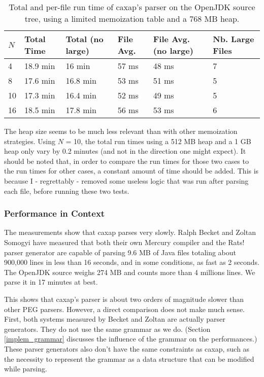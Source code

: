 \begin{table}[here]
\begin{tabular}{|l|l|l|l|l|l|}
\hline
$N$ & Total Time & Total (no large) & File Avg. &
File Avg. (no large) & Nb. Large Files\\
\hline
\hline
4  & 18.9 min & 16 min   & 57 ms & 48 ms & 7 \\ \hline
8  & 17.6 min & 16.8 min & 53 ms & 51 ms & 5 \\ \hline
10 & 17.3 min & 16.4 min & 52 ms & 49 ms & 5 \\ \hline
16 & 18.5 min & 17.8 min & 56 ms & 53 ms & 6 \\ \hline
\end{tabular}
\caption{Total and per-file run time of caxap's parser on the OpenJDK source
  tree, using a limited memoization table and a 768 MB heap.}
\label{measurements2}
\end{table}

The heap size seems to be much less relevant than with other memoization
strategies. Using $N$ = 10, the total run times using a 512 MB heap and a 1 GB
heap only vary by 0.2 minutes (and not in the direction one might expect). It
should be noted that, in order to compare the run times for those two cases to
the run times for other cases, a constant amount of time should be added. This
is because I - regrettably - removed some useless logic that was run after
parsing each file, before running these two tests.

\subsubsection{Performance in Context}

The measurements show that caxap parses very slowly. Ralph Becket and Zoltan
Somogyi have measured that both their own Mercury compiler and the Rats! parser
generator are capable of parsing 9.6 MB of Java files totaling about 900,000
lines in less than 16 seconds, and in some conditions, as fast as 2
seconds. \cite{becket2008} The OpenJDK source weighs 274 MB and counts more than
4 millions lines. We parse it in 17 minutes at best.

This shows that caxap's parser is about two orders of magnitude slower than
other PEG parsers. However, a direct comparison does not make much sense. First,
both systems measured by Becket and Zoltan are actually parser generators. They
do not use the same grammar as we do. (Section \ref{implem_grammar} discusses
the influence of the grammar on the performances.) These parser generators also
don't have the same constraints as caxap, such as the necessity to represent the
grammar as a data structure that can be modified while parsing.

